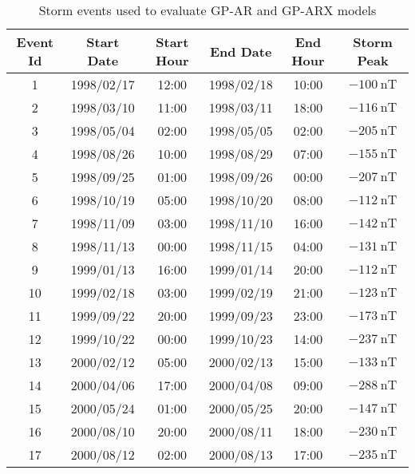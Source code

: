     \begin{table}[ht]
    \centering
    \caption{Storm events used to evaluate GP-AR and GP-ARX models}
    \label{table:teststorms}
    \begin{adjustbox}{width=\textwidth,totalheight=0.9\textheight,keepaspectratio}
    \begin{tabular}{cccccc}
    \hline
    \textbf{Event Id} & \textbf{Start Date} & \textbf{Start Hour} & \textbf{End Date} & \textbf{End Hour} & \textbf{Storm Peak} \\ \hline
    1 & 1998/02/17 & 12:00 & 1998/02/18 & 10:00 & $ \SI{-100}{\nano\tesla}$ \\
    2 & 1998/03/10 & 11:00 & 1998/03/11 & 18:00 & $ \SI{-116}{\nano\tesla}$ \\
    3 & 1998/05/04 & 02:00 & 1998/05/05 & 02:00 & $ \SI{-205}{\nano\tesla}$ \\
    4 & 1998/08/26 & 10:00 & 1998/08/29 & 07:00 & $ \SI{-155}{\nano\tesla}$ \\
    5 & 1998/09/25 & 01:00 & 1998/09/26 & 00:00 & $ \SI{-207}{\nano\tesla}$ \\
    6 & 1998/10/19 & 05:00 & 1998/10/20 & 08:00 & $ \SI{-112}{\nano\tesla}$ \\
    7 & 1998/11/09 & 03:00 & 1998/11/10 & 16:00 & $ \SI{-142}{\nano\tesla}$ \\
    8 & 1998/11/13 & 00:00 & 1998/11/15 & 04:00 & $ \SI{-131}{\nano\tesla}$ \\
    9 & 1999/01/13 & 16:00 & 1999/01/14 & 20:00 & $ \SI{-112}{\nano\tesla}$ \\
    10 & 1999/02/18 & 03:00 & 1999/02/19 & 21:00 & $ \SI{-123}{\nano\tesla}$ \\
    11 & 1999/09/22 & 20:00 & 1999/09/23 & 23:00 & $ \SI{-173}{\nano\tesla}$ \\
    12 & 1999/10/22 & 00:00 & 1999/10/23 & 14:00 & $ \SI{-237}{\nano\tesla}$ \\
    13 & 2000/02/12 & 05:00 & 2000/02/13 & 15:00 & $ \SI{-133}{\nano\tesla}$ \\
    14 & 2000/04/06 & 17:00 & 2000/04/08 & 09:00 & $ \SI{-288}{\nano\tesla}$ \\
    15 & 2000/05/24 & 01:00 & 2000/05/25 & 20:00 & $ \SI{-147}{\nano\tesla}$ \\
    16 & 2000/08/10 & 20:00 & 2000/08/11 & 18:00 & $ \SI{-230}{\nano\tesla}$ \\
    17 & 2000/08/12 & 02:00 & 2000/08/13 & 17:00 & $ \SI{-235}{\nano\tesla}$ \\

\end{tabular}
\end{adjustbox}
\end{table}
